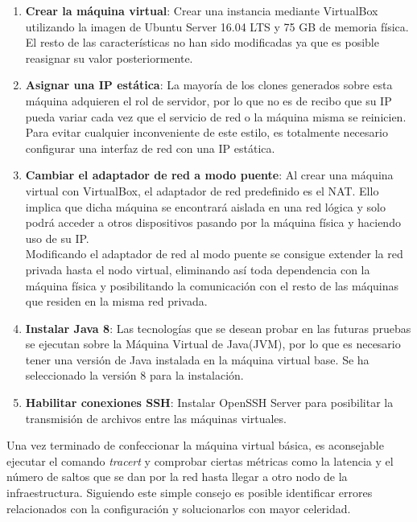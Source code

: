 \begin{enumerate}
	
	\item \textbf{Crear la máquina virtual}: Crear una instancia mediante VirtualBox utilizando la imagen de Ubuntu Server 16.04 LTS y 75 GB de memoria física. El resto de las características no han sido modificadas ya que es posible reasignar su valor posteriormente.
	
	\item \textbf{Asignar una IP estática}: La mayoría de los clones generados sobre esta máquina adquieren el rol de servidor, por lo que no es de recibo que su IP pueda variar cada vez que el servicio de red o la máquina misma se reinicien. Para evitar cualquier inconveniente de este estilo, es totalmente necesario configurar una interfaz de red con una IP estática.
	
	\item \textbf{Cambiar el adaptador de red a modo puente}: Al crear una máquina virtual con VirtualBox, el adaptador de red predefinido es el NAT. Ello implica que dicha máquina se encontrará aislada en una red lógica y solo podrá acceder a otros dispositivos pasando por la máquina física y haciendo uso de su IP.\\
	
	Modificando el adaptador de red al modo puente se consigue extender la red privada hasta el nodo virtual, eliminando así toda dependencia con la máquina física y posibilitando la comunicación con el resto de las máquinas que residen en la misma red privada.
	
	\item \textbf{Instalar Java 8}: Las tecnologías que se desean probar en las futuras pruebas se ejecutan sobre la Máquina Virtual de Java(JVM), por lo que es necesario tener una versión de Java instalada en la máquina virtual base. Se ha seleccionado la versión 8 para la instalación.
	
	\item \textbf{Habilitar conexiones SSH}: Instalar OpenSSH Server para posibilitar la transmisión de archivos entre las máquinas virtuales.

\end{enumerate}

Una vez terminado de confeccionar la máquina virtual básica, es aconsejable ejecutar el comando \textit{tracert} y comprobar ciertas métricas como la latencia y el número de saltos que se dan por la red hasta llegar a otro nodo de la infraestructura. Siguiendo este simple consejo es posible identificar errores relacionados con la configuración y solucionarlos con mayor celeridad.

